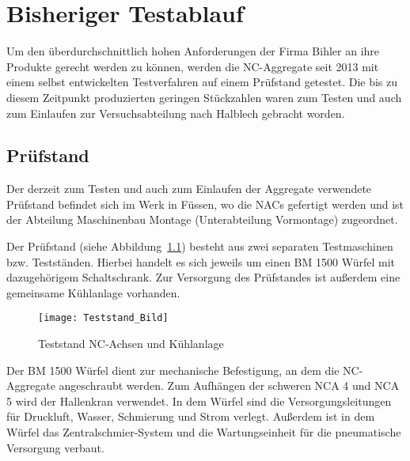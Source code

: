 \chapter{Bisheriger Testablauf}\label{cha:Bisheriger Testablauf}






Um den überdurchschnittlich hohen Anforderungen der Firma Bihler an ihre Produkte gerecht werden zu können, werden die NC-Aggregate seit 2013 mit einem selbst entwickelten Testverfahren auf einem Prüfstand getestet. Die bis zu diesem Zeitpunkt produzierten geringen Stückzahlen waren zum Testen und auch zum Einlaufen zur Versuchsabteilung nach Halblech gebracht worden.

\section{Prüfstand}

Der derzeit zum Testen und auch zum Einlaufen der Aggregate verwendete Prüfstand befindet sich im Werk in Füssen, wo die NACs gefertigt werden und ist der Abteilung Maschinenbau Montage (Unterabteilung Vormontage) zugeordnet.


Der Prüfstand (siehe Abbildung~\ref{fig:Pruefstand}) besteht aus zwei separaten Testmaschinen bzw. Testständen. Hierbei handelt es sich jeweils um einen BM 1500 Würfel mit dazugehörigem Schaltschrank. Zur Versorgung des Prüfstandes ist außerdem eine gemeinsame Kühlanlage vorhanden.


\begin{figure}[H]
\centering
\texttt{[image: Teststand\_Bild]} 
\caption{Teststand NC-Achsen und Kühlanlage} 
\label{fig:Pruefstand}
\end{figure}




Der BM 1500 Würfel dient zur mechanische Befestigung, an dem die NC-Aggregate angeschraubt werden. Zum Aufhängen der schweren NCA 4 und NCA 5 wird der Hallenkran verwendet. In dem Würfel sind die Versorgungsleitungen für Druckluft, Wasser, Schmierung und Strom verlegt. Außerdem ist in dem Würfel das Zentralschmier-System und die Wartungseinheit für die pneumatische Versorgung verbaut.

